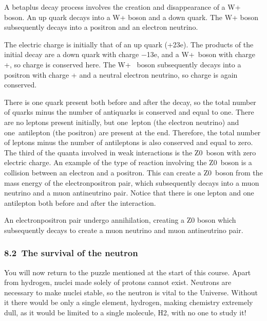 \documentclass[letterpaper,10pt,english]{sphinxmanual}
\let\sphinxpxdimen\pdfpxdimen\else\newdimen\sphinxpxdimen
\begin{document}
 A beta\sphinxhyphen{}plus decay process involves the creation and disappearance of a W+ boson. An up quark decays into a W+ boson and a down quark. The W+ boson subsequently decays into a positron and an electron neutrino.

The electric charge is initially that of an up quark (+23e). The products of the initial decay are a down quark with charge −13e, and a W+ boson with charge +, so charge is conserved here. The W+  boson subsequently decays into a positron with charge + and a neutral electron neutrino, so charge is again conserved.

There is one quark present both before and after the decay, so the total number of quarks minus the number of antiquarks is conserved and equal to one. There are no leptons present initially, but one lepton (the electron neutrino) and one antilepton (the positron) are present at the end. Therefore, the total number of leptons minus the number of antileptons is also conserved and equal to zero. The third of the quanta involved in weak interactions is the Z0 boson with zero electric charge. An
example of the type of reaction involving the Z0 boson is a collision between an electron and a positron. This can create a Z0 boson from the mass energy of the electron\textendash{}positron pair, which subsequently decays into a muon neutrino and a muon antineutrino pair. Notice that there is one lepton and one antilepton both before and after the interaction.

\sphinxincludegraphics[width=274\sphinxpxdimen,height=131\sphinxpxdimen]{{sm123_t06_p03_f09.eps}.jpg}

 An electron\textendash{}positron pair undergo annihilation, creating a Z0 boson which subsequently decays to create a muon neutrino and muon antineutrino pair.


\subsubsection{8.2 The survival of the neutron}
\label{\detokenize{content/session_00/Part_00_08:8.2_xa0The-survival-of-the-neutron}}
You will now return to the puzzle mentioned at the start of this course. Apart from hydrogen, nuclei made solely of protons cannot exist. Neutrons are necessary to make nuclei stable, so the neutron is vital to the Universe. Without it there would be only a single element, hydrogen, making chemistry extremely dull, as it would be limited to a single molecule, H2, with no one to study it!
\end{document}
